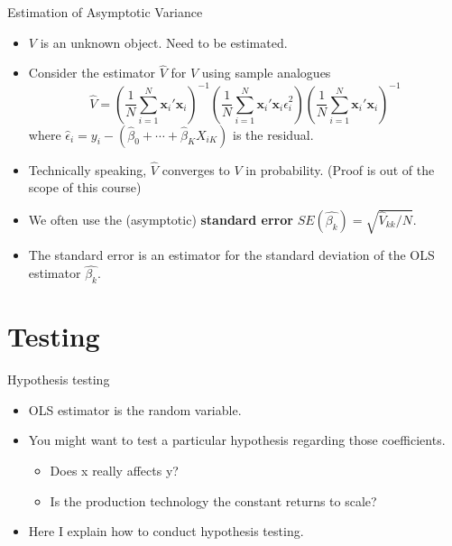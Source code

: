 \documentclass[
  ignorenonframetext,
]{beamer}
\providecommand{\tightlist}{%
  \setlength{\itemsep}{0pt}\setlength{\parskip}{0pt}}
\begin{document}
\begin{frame}{Estimation of Asymptotic Variance}
\protect\hypertarget{estimation-of-asymptotic-variance}{}

\begin{itemize}
\tightlist
\item
  \(V\) is an unknown object. Need to be estimated.
\item
  Consider the estimator \(\hat{V}\) for \(V\) using sample analogues \[
    \hat{V}=\left(\frac{1}{N}\sum_{i=1}^{N}\mathbf{x}_{i}'\mathbf{x}_{i}\right)^{-1}\left(\frac{1}{N}\sum_{i=1}^{N}\mathbf{x}_{i}'\mathbf{x}_{i}\hat{\epsilon}_{i}^{2}\right)\left(\frac{1}{N}\sum_{i=1}^{N}\mathbf{x}_{i}'\mathbf{x}_{i}\right)^{-1}
  \] where
  \(\hat{\epsilon}_i = y_i - (\hat{\beta}_0 + \cdots + \hat{\beta}_K X_{iK})\)
  is the residual.
\item
  Technically speaking, \(\hat{V}\) converges to \(V\) in probability.
  (Proof is out of the scope of this course)
\item
  We often use the (asymptotic) \textbf{standard error}
  \(SE(\hat{\beta_k}) = \sqrt{\hat{V}_{kk} / N }\).
\item
  The standard error is an estimator for the standard deviation of the
  OLS estimator \(\hat{\beta_k}\).
\end{itemize}

\end{frame}

\hypertarget{testing}{%
\section{Testing}\label{testing}}

\begin{frame}{Hypothesis testing}
\protect\hypertarget{hypothesis-testing}{}

\begin{itemize}
\tightlist
\item
  OLS estimator is the random variable.
\item
  You might want to test a particular hypothesis regarding those
  coefficients.

  \begin{itemize}
  \tightlist
  \item
    Does x really affects y?
  \item
    Is the production technology the constant returns to scale?
  \end{itemize}
\item
  Here I explain how to conduct hypothesis testing.
\end{itemize}

\end{frame}
\end{document}

